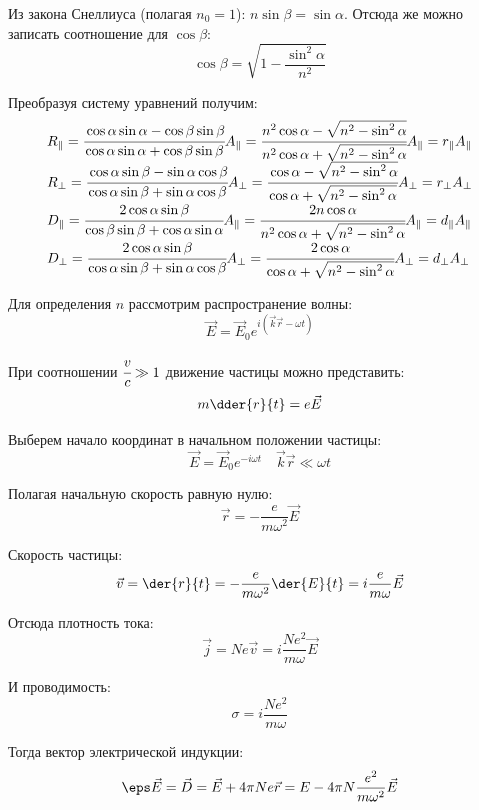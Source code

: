 Из закона Снеллиуса (полагая \( n_0 = 1 \)): \( n\sin\beta = \sin\alpha \). 
Отсюда же можно записать соотношение для \( \cos\beta \):
\[
	\cos\beta = \sqrt{1-\frac{\sin^2\alpha}{n^2}}
\]

Преобразуя систему уравнений получим:
\[
	\begin{array}{ll}
		R_{\Vert} = \cfrac{\cos\alpha\sin\alpha - \cos\beta\sin\beta}
			{\cos\alpha\sin\alpha + \cos\beta\sin\beta}A_{\Vert} = 
			\cfrac{n^2\cos\alpha - \sqrt{n^2-\sin^2\alpha}}
			{n^2\cos\alpha + \sqrt{n^2-\sin^2\alpha}} A_{\Vert} = 
			r_{\Vert} A_{\Vert} \\
		R_{\bot} = \cfrac{\cos\alpha\sin\beta - \sin\alpha\cos\beta}
			{\cos\alpha\sin\beta + \sin\alpha\cos\beta}A_{\bot} = 
			\cfrac{\cos\alpha - \sqrt{n^2-\sin^2\alpha}}
			{\cos\alpha + \sqrt{n^2-\sin^2\alpha}}A_{\bot} = 
			r_{\bot} A_{\bot} \\
		D_{\Vert} = \cfrac{2\cos\alpha\sin\beta}
			{\cos\beta\sin\beta + \cos\alpha\sin\alpha}A_{\Vert} = 
			\cfrac{2n\cos\alpha}{n^2\cos\alpha + \sqrt{n^2-\sin^2\alpha}}
			A_{\Vert} = d_{\Vert} A_{\Vert} \\
		D_{\bot} = \cfrac{2\cos\alpha\sin\beta}
			{\cos\alpha\sin\beta + \sin\alpha\cos\beta}A_{\bot} =
			\cfrac{2\cos\alpha}{\cos\alpha + \sqrt{n^2-\sin^2\alpha}}
			A_{\bot} = d_{\bot} A_{\bot}
	\end{array}
\]

Для определения \( n \) рассмотрим распространение волны:
\[
	\vec{E} = \vec{E}_0 e^{i(\vec{k}\vec{r} - \omega t)}
\]

При соотношении \( \cfrac{v}{c} \gg 1 \) движение частицы можно представить:
\[
	m\dder{r}{t} = e\vec{E}
\]

Выберем начало координат в начальном положении частицы:
\[
	\vec{E} = \vec{E}_0 e^{-i\omega t} \quad \vec{k}\vec{r} \ll \omega t
\]

Полагая начальную скорость равную нулю:
\[
	\vec{r} = -\frac{e}{m\omega^2}\vec{E}
\]

Скорость частицы:
\[
	\vec{v} = \der{r}{t} = -\frac{e}{m\omega^2}\der{E}{t} = i\frac{e}{m\omega}\vec{E}
\]

Отсюда плотность тока:
\[
	\vec{j} = Ne\vec{v} = i\frac{Ne^2}{m\omega}\vec{E}
\]

И проводимость:
\[
	\sigma = i\frac{Ne^2}{m\omega}
\]

Тогда вектор электрической индукции:
\[
	\eps\vec{E} = \vec{D} = \vec{E} + 4\pi N e \vec{r} = 
		E - 4\pi N \frac{e^2}{m\omega^2}\vec{E} 
\]

